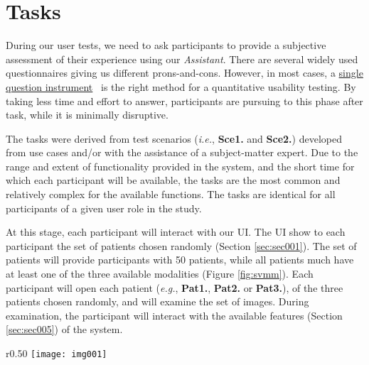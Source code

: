 
\section{Tasks}
\label{sec:sec007}

During our user tests, we need to ask participants to provide a subjective assessment of their experience using our \textit{Assistant}. There are several widely used questionnaires giving us different prons-and-cons. However, in most cases, a \hyperlink{https://www.nngroup.com/articles/keep-online-surveys-short/}{single question instrument}~\cite{sauro201210} is the right method for a quantitative usability testing. By taking less time and effort to answer, participants are pursuing to this phase after task, while it is minimally disruptive.

\clearpage

The tasks were derived from test scenarios ({\it i.e.}, {\bf Sce1.} and {\bf Sce2.}) developed from use cases and/or with the assistance of a subject-matter expert.  Due to the range and extent of functionality provided in the system, and the short time for which each participant will be available, the tasks are the most common and relatively complex for the available functions. The tasks are identical for all participants of a given user role in the study.

At this stage, each participant will interact with our UI. The UI show to each participant the set of patients chosen randomly (Section \ref{sec:sec001}). The set of patients will provide participants with 50 patients, while all patients much have at least one of the three available modalities (Figure \ref{fig:svmm}). Each participant will open each patient ({\it e.g.}, {\bf Pat1.}, {\bf Pat2.} or {\bf Pat3.}), of the three patients chosen randomly, and will examine the set of images. During examination, the participant will interact with the available features (Section \ref{sec:sec005}) of the system.


\hfill

\begin{wrapfigure}{r}{0.50\textwidth}
\centering
\texttt{[image: img001]}
\caption{Diagram representing the use of the \textit{Assistant} by clinicians.}
\label{fig:svmm}
\end{wrapfigure}

